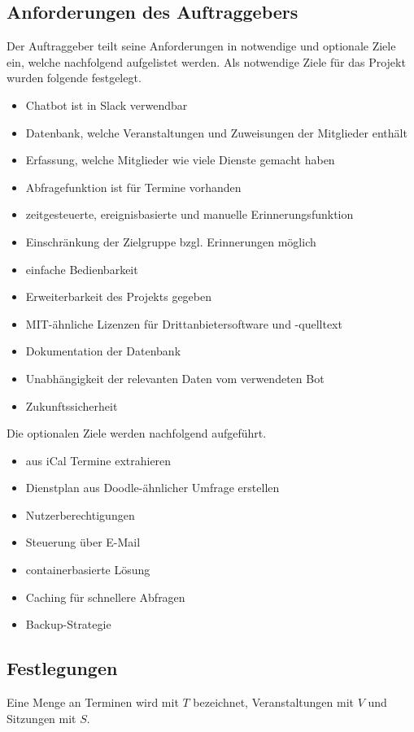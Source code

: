 \subsection{Anforderungen des Auftraggebers}
Der Auftraggeber teilt seine Anforderungen in notwendige und optionale Ziele ein, welche nachfolgend aufgelistet werden. Als notwendige Ziele für das Projekt wurden folgende festgelegt.

\begin{itemize}
	\item Chatbot ist in Slack verwendbar
	\item Datenbank, welche Veranstaltungen und Zuweisungen der Mitglieder enthält
	\item Erfassung, welche Mitglieder wie viele Dienste gemacht haben
	\item Abfragefunktion ist für Termine vorhanden
	\item zeitgesteuerte, ereignisbasierte und manuelle Erinnerungsfunktion
	\item Einschränkung der Zielgruppe bzgl. Erinnerungen möglich
	\item einfache Bedienbarkeit
	\item Erweiterbarkeit des Projekts gegeben
	\item MIT-ähnliche Lizenzen für Drittanbietersoftware und -quelltext
	\item Dokumentation der Datenbank
	\item Unabhängigkeit der relevanten Daten vom verwendeten Bot
	\item Zukunftssicherheit
\end{itemize}


Die optionalen Ziele werden nachfolgend aufgeführt.
\begin{itemize}
	\item aus iCal Termine extrahieren
	\item Dienstplan aus Doodle-ähnlicher Umfrage erstellen
	\item Nutzerberechtigungen
	\item Steuerung über E-Mail
	\item containerbasierte Lösung
	\item Caching für schnellere Abfragen
	\item Backup-Strategie
\end{itemize}


\subsection{Festlegungen}

Eine Menge an Terminen wird mit $T$ bezeichnet, Veranstaltungen mit $V$ und Sitzungen mit $S$.
